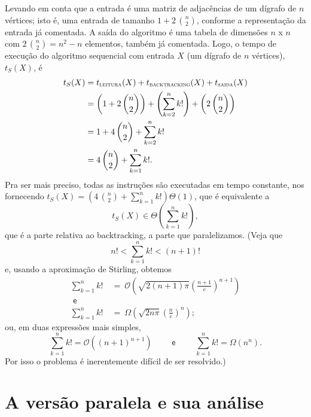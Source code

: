 \documentclass[a4paper,article,10pt]{article}
\newcommand{\e}{\textsf{ e }}
\newcommand{\parenteses}[1] {\left ( {#1} \right )}
\begin{document}
    Levando em conta que a entrada é uma matriz de adjacências de um dígrafo de
    $n$ vértices; isto é, uma entrada de tamanho $1 + 2\,\binom{n}{2}$, conforme
    a representação da entrada já comentada.
    A saída do algoritmo é uma tabela de dimensões $n$ x $n$ com
    $2\,\binom{n}{2} = n^2 - n$ elementos, também já comentada.
    Logo, o tempo de execução do algoritmo sequencial com entrada $X$ (um
    dígrafo de $n$ vértices), $t_S(X)$, é
    \begin{align*}
      t_S(X) &= t_{\textsc{leitura}}(X) + t_{\textsc{backtracking}}(X)
                + t_{\textsc{saida}}(X) \\
             &= \parenteses{1 + 2\,\binom{n}{2}} + \parenteses{\sum_{k=2}^n k!}
                + \parenteses{2\,\binom{n}{2}} \\
             &= 1 + 4\,\binom{n}{2} + \sum_{k=2}^n k! \\
             &= 4\,\binom{n}{2} + \sum_{k=1}^n k!.
    \end{align*}
    Pra ser mais preciso, todas as instruções são executadas em tempo constante,
    nos fornecendo $t_S(X) = \parenteses{4\,\binom{n}{2} + \sum_{k=1}^n k!}
    \Theta(1)$, que é equivalente a
    \begin{equation*}
      t_S(X)\in \Theta\parenteses{\sum_{k=1}^n k!},
    \end{equation*}
    que é a parte relativa ao backtracking, a parte que paralelizamos.
    (Veja que
    \begin{equation*}
      n! < \sum_{k=1}^n k! < (n+1)!
    \end{equation*}
    e, usando a aproximação de Stirling, obtemos
    \begin{align*}
      \sum_{k=1}^n k! ~&=~ \mathcal{O}\parenteses{\sqrt{2 (n+1)
        \pi} \parenteses{\frac{n+1}{e}}^{n+1}} \\
      \e \\
      \sum_{k=1}^n k! ~&=~ \Omega\parenteses{\sqrt{2 n \pi}
        \parenteses{\frac{n}{e}}^n};
    \end{align*}
    ou, em duas expressões mais simples, 
    \begin{equation*}
      \sum_{k=1}^n k! = \mathcal{O}\parenteses{(n+1)^{n+1}}
      \qquad \e \qquad
      \sum_{k=1}^n k! = \Omega(n^n).
    \end{equation*}
    Por isso o problema é inerentemente difícil de ser resolvido.)

  \section{A versão paralela e sua análise}
\end{document}
